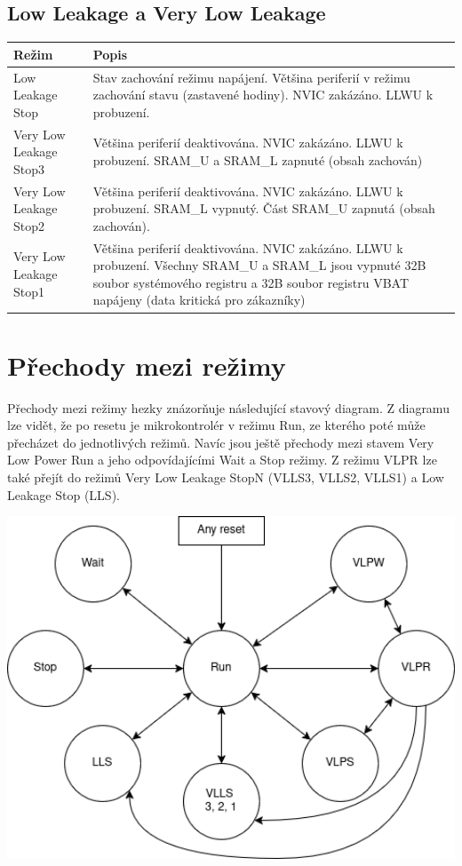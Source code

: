 \documentclass{article}
\begin{document}
\subsection{Low Leakage a Very Low Leakage}

\begin{tabularx}{\textwidth}{|>{\centering\arraybackslash}p{}|X|}
    \hline
    \textbf{Režim} & \textbf{Popis} \\
    \hline
    Low Leakage Stop & Stav zachování režimu napájení. Většina periferií v
    režimu zachování stavu (zastavené hodiny). NVIC zakázáno. LLWU k probuzení.
    \\
    \hline
    Very Low Leakage Stop3 & Většina periferií deaktivována. NVIC zakázáno.
    LLWU k probuzení. SRAM\_U a SRAM\_L zapnuté (obsah zachován) \\
    \hline
    Very Low Leakage Stop2 & Většina periferií deaktivována. NVIC zakázáno.
    LLWU k probuzení. SRAM\_L vypnutý. Část SRAM\_U zapnutá (obsah zachován).\\
    \hline
    Very Low Leakage Stop1 & Většina periferií deaktivována. NVIC zakázáno.
    LLWU k probuzení. Všechny SRAM\_U a SRAM\_L jsou vypnuté 32B soubor
    systémového registru a 32B soubor registru VBAT napájeny (data kritická
    pro zákazníky) \\
    \hline
\end{tabularx}

\newpage

\section{Přechody mezi režimy}

Přechody mezi režimy hezky znázorňuje následující stavový diagram. Z diagramu
lze vidět, že po resetu je mikrokontrolér v režimu Run, ze kterého poté může
přecházet do jednotlivých režimů. Navíc jsou ještě přechody mezi stavem Very
Low Power Run a jeho odpovídajícími Wait a Stop režimy. Z režimu VLPR lze také
přejít do režimů Very Low Leakage StopN (VLLS3, VLLS2, VLLS1) a Low Leakage
Stop (LLS).

\includegraphics[width=1.0\textwidth]{power-modes.png}
\end{document}
